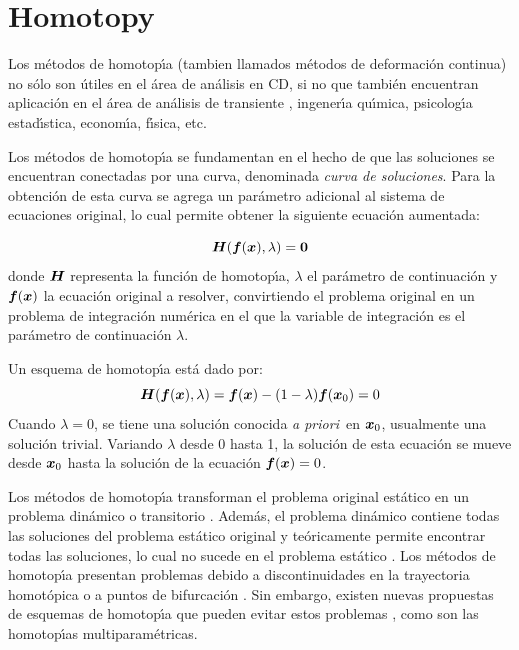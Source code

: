 \documentclass[conference,letterpaper,onecolumn]{IEEEtran}
\newcommand{\pig}[1]{\mbox{\boldmath ${#1}$}	}
\begin{document}
\section{Homotopy}

Los m\'etodos de homotop\'{\i}a (tambien llamados m\'etodos de deformaci\'on continua)
no s\'olo son \'utiles en el \'area de an\'alisis en CD, si no que tambi\'en encuentran
aplicaci\'on en el \'area de an\'alisis de transiente \cite{homo_ArtificialP}, 
ingener\'{\i}a qu\'{\i}mica, psicolog\'{\i}a estad\'{\i}stica, econom\'{\i}a, f\'{\i}sica, etc.




Los m\'etodos de homotop\'{\i}a se fundamentan en el hecho de
que las so\-lu\-cio\-nes se encuentran conectadas por una curva, denominada
\emph{curva de so\-lu\-cio\-nes}. 
Para la obtenci\'on de esta curva se agrega
un par\'ametro adicional al sistema de ecuaciones original, lo cual
permite obtener la siguiente ecuaci\'on aumentada:

\begin{equation}
\pig{H}(\pig{f}(\pig{x}),\lambda )=\pig{0}
\label{homotopia}
\end{equation}
donde $\pig{H}$ representa la funci\'on de homotop\'{\i}a,
$\lambda$ el par\'ametro de continuaci\'on y
$\pig{f}(\pig{x})$ la ecuaci\'on original a resolver,
convirtiendo el problema original en un problema de integraci\'on
num\'erica \cite{homo_richter} en el que la variable de integraci\'on es el par\'ametro de
continuaci\'on $\lambda$.




Un esquema  de homotop\'{\i}a est\'a dado por:
\begin{equation}
\pig{H}(\pig{f}(\pig{x}),\lambda ) =
\pig{f}(\pig{x})-(1-\lambda )\pig{f}(\pig{x}_{0}) = 0
\label{hexampl}
\end{equation}
Cuando $\lambda =0$, se tiene una soluci\'on conocida {\em a priori}\,
en $\pig{x}_{0}$, usualmente una soluci\'on trivial.
Variando $\lambda$ desde 0 hasta 1, la soluci\'on
de esta ecuaci\'on se mueve desde $\pig{x}_{0}$ hasta la soluci\'on
de la ecuaci\'on $\pig{f}(\pig{x})=0$. 

Los m\'etodos de homotop\'{\i}a transforman el problema original
est\'atico en un problema din\'amico o transitorio \cite{homo_ogrodzki}.
Adem\'as, el problema din\'amico contiene todas las soluciones del
problema est\'atico original y te\'oricamente
permite encontrar todas las soluciones, lo cual no sucede en el problema
est\'atico \cite{homo_ogrodzki}.
Los m\'etodos de homotop\'{\i}a presentan problemas
debido a discontinuidades en la trayectoria homot\'opica o a puntos
de bi\-fur\-ca\-ci\'on \cite{homo_ogrodzki,homo_DWolfMulti}.
Sin embargo, existen nuevas propuestas de esquemas de
homotop\'{\i}a que pueden evitar estos problemas
\cite{homo_DWolfMulti}, como son las homotop\'{\i}as multiparam\'etricas.
\end{document}
